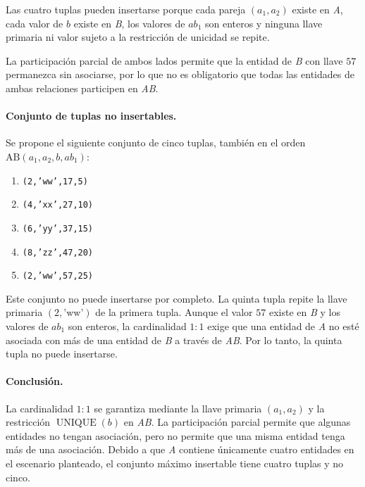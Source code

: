 Las cuatro tuplas pueden insertarse porque cada pareja $(a_1,a_2)$
existe en \emph{A}, cada valor de $b$ existe en \emph{B}, los valores
de $ab_1$ son enteros y ninguna llave primaria ni valor sujeto a la
restricción de unicidad se repite.

La participación parcial de ambos lados permite que la entidad de
\emph{B} con llave $57$ permanezca sin asociarse, por lo que no es
obligatorio que todas las entidades de ambas relaciones participen
en \emph{AB}.

\paragraph{Conjunto de tuplas no insertables.}

Se propone el siguiente conjunto de cinco tuplas, también en el orden
$\mathrm{AB}(a_1,a_2,b,ab_1)$:

\begin{enumerate}[label=\roman*.,leftmargin=*,itemsep=0.2em]
    \item \texttt{(2,'ww',17,5)}
    \item \texttt{(4,'xx',27,10)}
    \item \texttt{(6,'yy',37,15)}
    \item \texttt{(8,'zz',47,20)}
    \item \texttt{(2,'ww',57,25)}
\end{enumerate}

Este conjunto no puede insertarse por completo. La quinta tupla
repite la llave primaria $(2,\text{'ww'})$ de la primera tupla.
Aunque el valor $57$ existe en \emph{B} y los valores de $ab_1$ son
enteros, la cardinalidad $1:1$ exige que una entidad de \emph{A} no
esté asociada con más de una entidad de \emph{B} a través de
\emph{AB}. Por lo tanto, la quinta tupla no puede insertarse.

\paragraph{Conclusión.}

La cardinalidad $1:1$ se garantiza mediante la llave primaria
$(a_1,a_2)$ y la restricción $\operatorname{UNIQUE}(b)$ en
\emph{AB}. La participación parcial permite que algunas entidades
no tengan asociación, pero no permite que una misma entidad tenga
más de una asociación. Debido a que \emph{A} contiene únicamente
cuatro entidades en el escenario planteado, el conjunto máximo
insertable tiene cuatro tuplas y no cinco.

